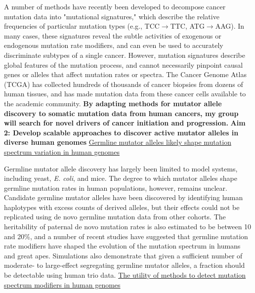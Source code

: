 \documentclass[11pt,a4paper,sans]{moderncv}
\begin{document}
A number of methods have recently been developed to decompose cancer mutation data 
into "mutational signatures," which describe the relative frequencies of particular 
mutation types (e.g., TCC$\rightarrow$TTC, ATG$\rightarrow$AAG). 
In many cases, these signatures reveal the subtle activities of exogenous or 
endogenous mutation rate modifiers, and can even be used to accurately discriminate 
subtypes of a single cancer. However, mutation signatures describe global features 
of the mutation process, and cannot necessarily pinpoint causal genes or alleles that affect 
mutation rates or spectra. The Cancer Genome Atlas (TCGA) has collected hundreds of 
thousands of cancer biopsies from dozens of human tissues, and has made mutation 
data from these cancer cells available to the academic community. \textbf{By adapting 
methods for mutator allele discovery to somatic mutation data from human cancers, 
my group will search for novel drivers of cancer initiation and progression.}
\break \break
\textbf{Aim 2: Develop scalable approaches to discover active mutator alleles in diverse human genomes}
\underline{Germline mutator alleles likely shape mutation spectrum variation in human genomes}

Germline mutator allele discovery has largely been limited to model systems, 
including yeast, \emph{E. coli}, and mice. The degree to which mutator alleles shape 
germline mutation rates in human populations, however, remains unclear. Candidate 
germline mutator alleles have been discovered by identifying human 
haplotypes with excess counts of derived alleles, but their effects could not be 
replicated using de novo germline mutation data from other cohorts. The heritability
of paternal de novo mutation rates is also estimated to be between 10 and 20\%, 
and a number of recent studies have suggested that germline mutation rate 
modifiers have shaped the evolution of the mutation spectrum in humans and 
great apes. Simulations also demonstrate that given a sufficient number of 
moderate- to large-effect segregating germline mutator alleles, a fraction 
should be detectable using human trio data. 
\break \break
\underline{The utility of methods to detect mutation spectrum modifiers in human genomes}
\end{document}
